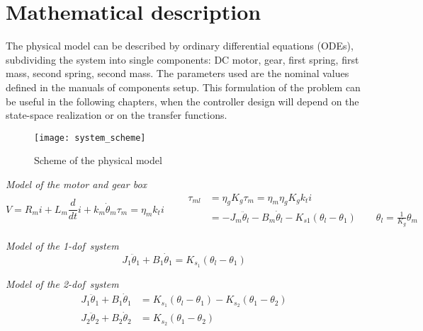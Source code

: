 \section{Mathematical description}

The physical model can be described by ordinary differential equations (ODEs), subdividing the system into single components: DC motor, gear, first spring, first mass, second spring, second mass. The parameters used are the nominal values defined in the manuals of components setup. This formulation of the problem can be useful in the following chapters, when the controller design will depend on the state-space realization or on the transfer functions.
\begin{figure*}[h]
	\centering
	\texttt{[image: system\_scheme]}
	\caption{Scheme of the physical model}
\end{figure*}

\noindent \textit{Model of the motor and gear box}
\begin{subequations}
	\begin{equation}
		V = R_m i + L_m \frac{d}{dt}i + k_m \dot{\theta}_m
	\end{equation}
	\begin{equation}
		\tau_m = \eta_m k_t i
	\end{equation}
	\begin{equation}
		\begin{split}
			\qquad
			\tau_{ml} &= \eta_g K_g \tau_m = \eta_m \eta_g K_g k_t i \\
			&= -J_m \ddot{\theta}_l - B_m \dot{\theta}_l - K_{s1} ( \theta_l - \theta_1 )
			\qquad 
			\theta_l = \frac {1}{K_g} \theta_m
		\end{split}
	\end{equation}
	\label{fig:model_equations}
\end{subequations}

\noindent \textit{Model of the \acrshort{1-dof}\ system}
\begin{equation}
	J_1 \ddot{\theta}_1 + B_1 \dot{\theta}_1 = K_{s_1} ( \theta_l - \theta_1 )
\end{equation}

\noindent \textit{Model of the \acrshort{2-dof}\ system}
\begin{subequations}
	\begin{align}
		J_1 \ddot{\theta}_1 + B_1 \dot{\theta}_1 &= K_{s_1} ( \theta_l - \theta_1 ) - K_{s_2} ( \theta_1 - \theta_2 ) \\
		J_2 \ddot{\theta}_2 + B_2 \dot{\theta}_2 &= K_{s_2} ( \theta_1 - \theta_2 )
	\end{align}
\end{subequations}

